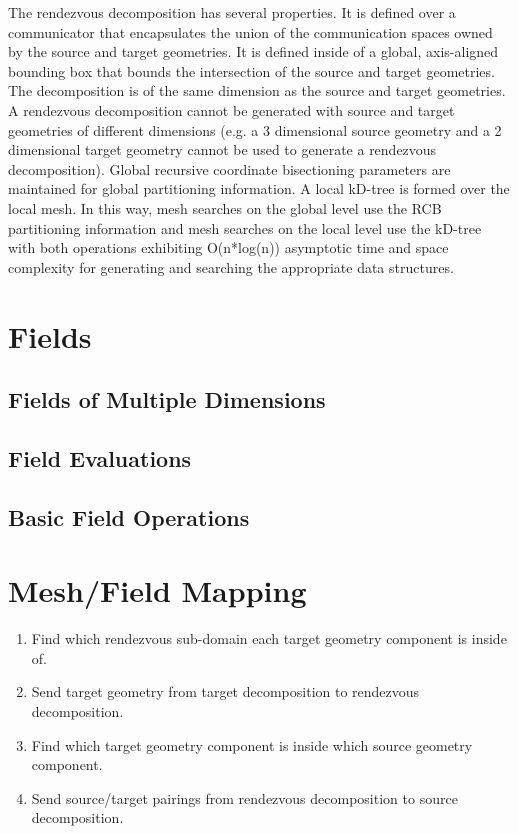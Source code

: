 \documentclass[letterpaper,12pt]{article}
\begin{document}
The rendezvous decomposition has several properties. It is defined
over a communicator that encapsulates the union of the communication
spaces owned by the source and target geometries. It is defined inside
of a global, axis-aligned bounding box that bounds the intersection of
the source and target geometries. The decomposition is of the same
dimension as the source and target geometries. A rendezvous
decomposition cannot be generated with source and target geometries of
different dimensions (e.g. a 3 dimensional source geometry and a 2
dimensional target geometry cannot be used to generate a rendezvous
decomposition). Global recursive coordinate bisectioning parameters
are maintained for global partitioning information. A local kD-tree is
formed over the local mesh. In this way, mesh searches on the global
level use the RCB partitioning information and mesh searches on the
local level use the kD-tree with both operations exhibiting
O(n*log(n)) asymptotic time and space complexity for generating and
searching the appropriate data structures.

\clearpage

\section{Fields}\label{sec:field}

\subsection{Fields of Multiple Dimensions}\label{subsec:field_dim}

\subsection{Field Evaluations}\label{subsec:eval}

\subsection{Basic Field Operations}

\clearpage

\section{Mesh/Field Mapping}\label{sec:map}

\begin{enumerate}
\item Find which rendezvous sub-domain each target geometry component
  is inside of.
\item Send target geometry from target decomposition to rendezvous
  decomposition.
\item Find which target geometry component is inside which source
  geometry component.
\item Send source/target pairings from rendezvous decomposition to
  source decomposition.
\end{enumerate}
\end{document}
